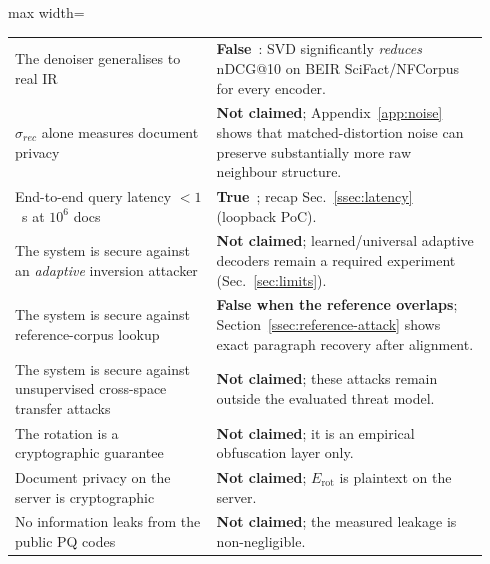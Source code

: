 \begin{table}[tbp]
\begin{singlespace}
\begin{adjustbox}{max width=\linewidth}
\begin{tabular}{@{}p{0.40\linewidth}p{0.54\linewidth}@{}}
The denoiser generalises to real IR &
\textbf{False}~\cite{ref_alpha}: SVD significantly \emph{reduces}
nDCG@10 on BEIR SciFact/NFCorpus for every encoder. \\
$\sigma_{rec}$ alone measures document privacy &
\textbf{Not claimed}; Appendix~\ref{app:noise} shows that
matched-distortion noise can preserve substantially more raw neighbour
structure. \\
End-to-end query latency $<1$~s at $10^6$ docs &
\textbf{True}~\cite{ref_alpha}; recap Sec.~\ref{ssec:latency} (loopback PoC). \\
The system is secure against an \emph{adaptive} inversion attacker &
\textbf{Not claimed}; learned/universal adaptive decoders remain a
required experiment (Sec.~\ref{sec:limits}). \\
The system is secure against reference-corpus lookup &
\textbf{False when the reference overlaps}; Section~\ref{ssec:reference-attack}
shows exact paragraph recovery after alignment. \\
The system is secure against unsupervised cross-space transfer attacks &
\textbf{Not claimed}; these attacks remain outside the evaluated threat
model. \\
The rotation is a cryptographic guarantee &
\textbf{Not claimed}; it is an empirical obfuscation layer only. \\
Document privacy on the server is cryptographic &
\textbf{Not claimed}; $E_{\mathrm{rot}}$ is plaintext on the server. \\
No information leaks from the public PQ codes &
\textbf{Not claimed}; the measured leakage is non-negligible. \\
\bottomrule
\end{tabular}
\end{adjustbox}
\end{singlespace}
\end{table}

